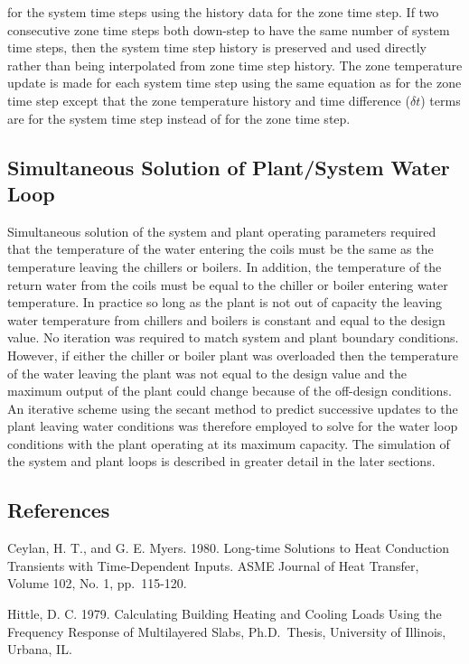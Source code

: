 for the system time steps using the history data for the zone time step. If two consecutive zone time steps both down-step to have the same number of system time steps, then the system time step history is preserved and used directly rather than being interpolated from zone time step history. The zone temperature update is made for each system time step using the same equation as for the zone time step except that the zone temperature history and time difference (\(\delta t\)) terms are for the system time step instead of for the zone time step.

\subsection{Simultaneous Solution of Plant/System Water Loop}\label{simultaneous-solution-of-plantsystem-water-loop}

Simultaneous solution of the system and plant operating parameters required that the temperature of the water entering the coils must be the same as the temperature leaving the chillers or boilers. In addition, the temperature of the return water from the coils must be equal to the chiller or boiler entering water temperature. In practice so long as the plant is not out of capacity the leaving water temperature from chillers and boilers is constant and equal to the design value. No iteration was required to match system and plant boundary conditions. However, if either the chiller or boiler plant was overloaded then the temperature of the water leaving the plant was not equal to the design value and the maximum output of the plant could change because of the off-design conditions. An iterative scheme using the secant method to predict successive updates to the plant leaving water conditions was therefore employed to solve for the water loop conditions with the plant operating at its maximum capacity. The simulation of the system and plant loops is described in greater detail in the later sections.

\subsection{References}\label{references-043}

Ceylan, H. T., and G. E. Myers. 1980. Long-time Solutions to Heat Conduction Transients with Time-Dependent Inputs. ASME Journal of Heat Transfer, Volume 102, No. 1, pp.~115-120.

Hittle, D. C. 1979. Calculating Building Heating and Cooling Loads Using the Frequency Response of Multilayered Slabs, Ph.D.~Thesis, University of Illinois, Urbana, IL.

